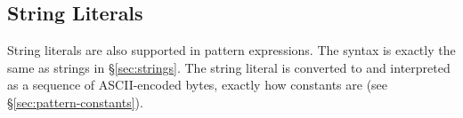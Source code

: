 \subsection{String Literals}
String literals are also supported in pattern expressions.  The syntax is exactly the same as strings in \S\ref{sec:strings}.  The string literal is converted to and interpreted as a sequence of ASCII-encoded bytes, exactly how constants are (see \S\ref{sec:pattern-constants}).  



